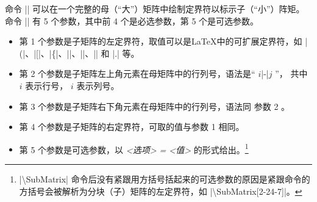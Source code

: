 \documentclass[dvipsnames]{article}%
\begin{document}
\label{sub-matrix}

命令 |\SubMatrix| 可以在一个完整的母（“大”）矩阵中绘制定界符以标示子（“小”）阵矩。
命令 |\SubMatrix| 有 5 个参数，其中前 4 个是必选参数，第 5 个是可选参数。

\begin{itemize}
\item 第 1 个参数是子矩阵的左定界符，取值可以是\LaTeX 中的可扩展定界符，如 
|(|、|[|、|\{|、|\langle|、|\lgroup|、|\lfloor| 和 |.| 等。
\item 第 2 个参数是子矩阵左上角元素在母矩阵中的行列号，语法是“  $i$|-|$j$ ”，
共中 $i$ 表示行号， $i$ 表示列号。
\item 第 3 个参数是子矩阵右下角元素在母矩阵中的行列号，语法同 参数 2 。
\item 第 4 个参数是子矩阵的右定界符，可取的值与参数 1 相同。

\item 第 5 个参数是可选参数，以 \textsl{<选项> = <值>} 的形式给出。\footnote{|\textbackslash SubMatrix| 命令后没有紧跟用方括号括起来的可选参数的原因是紧跟命令的方括号会被解析为分块（子）矩阵的左定界符，如 |\textbackslash SubMatrix[{2-2}{4-7}]|。}
\end{itemize}
\end{document}
